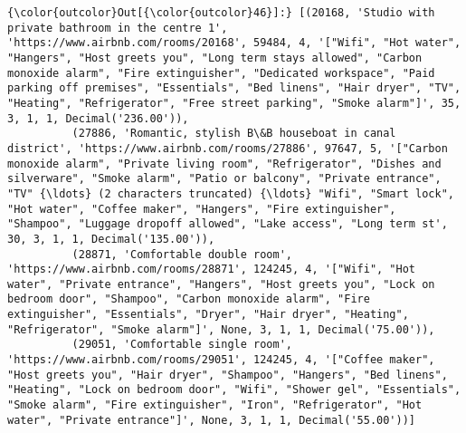 \documentclass[11pt]{article}
\begin{document}
\begin{Verbatim}[commandchars=\\\{\}]
{\color{outcolor}Out[{\color{outcolor}46}]:} [(20168, 'Studio with private bathroom in the centre 1', 'https://www.airbnb.com/rooms/20168', 59484, 4, '["Wifi", "Hot water", "Hangers", "Host greets you", "Long term stays allowed", "Carbon monoxide alarm", "Fire extinguisher", "Dedicated workspace", "Paid parking off premises", "Essentials", "Bed linens", "Hair dryer", "TV", "Heating", "Refrigerator", "Free street parking", "Smoke alarm"]', 35, 3, 1, 1, Decimal('236.00')),
          (27886, 'Romantic, stylish B\&B houseboat in canal district', 'https://www.airbnb.com/rooms/27886', 97647, 5, '["Carbon monoxide alarm", "Private living room", "Refrigerator", "Dishes and silverware", "Smoke alarm", "Patio or balcony", "Private entrance", "TV" {\ldots} (2 characters truncated) {\ldots} "Wifi", "Smart lock", "Hot water", "Coffee maker", "Hangers", "Fire extinguisher", "Shampoo", "Luggage dropoff allowed", "Lake access", "Long term st', 30, 3, 1, 1, Decimal('135.00')),
          (28871, 'Comfortable double room', 'https://www.airbnb.com/rooms/28871', 124245, 4, '["Wifi", "Hot water", "Private entrance", "Hangers", "Host greets you", "Lock on bedroom door", "Shampoo", "Carbon monoxide alarm", "Fire extinguisher", "Essentials", "Dryer", "Hair dryer", "Heating", "Refrigerator", "Smoke alarm"]', None, 3, 1, 1, Decimal('75.00')),
          (29051, 'Comfortable single room', 'https://www.airbnb.com/rooms/29051', 124245, 4, '["Coffee maker", "Host greets you", "Hair dryer", "Shampoo", "Hangers", "Bed linens", "Heating", "Lock on bedroom door", "Wifi", "Shower gel", "Essentials", "Smoke alarm", "Fire extinguisher", "Iron", "Refrigerator", "Hot water", "Private entrance"]', None, 3, 1, 1, Decimal('55.00'))]
\end{Verbatim}
            

    
    
    
    
\end{document}
